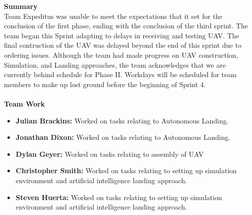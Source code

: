 \noindent \Large{\textbf{Summary}}\\
\normalsize Team Expeditus was unable to meet the expectations that it set for the conclusion of the first phase, ending with the conclusion of the third sprint. The team began this Sprint adapting to delays in receiving and testing UAV. The final contruction of the UAV was delayed beyond the end of this sprint due to ordering issues. Although the team had made progress on UAV construction, Simulation, and Landing approaches, the team acknowledges that we are currently behind schedule for Phase II. Workdays will be scheduled for team members to make up lost ground before the beginning of Sprint 4.\\
\vspace{5mm}
\\
\noindent \Large{\textbf{Team Work}}
\normalsize
\begin{itemize}
\item \textbf{Julian Brackins:} Worked on tasks relating to Autonomous Landing.
\item \textbf{Jonathan Dixon:} Worked on tasks relating to Autonomous Landing.
\item \textbf{Dylan Geyer:} Worked on tasks relating to assembly of UAV
\item \textbf{Christopher Smith:} Worked on tasks relating to setting up simulation environment and artificial intelligence landing approach.
\item \textbf{Steven Huerta:} Worked on tasks relating to setting up simulation environment and artificial intelligence landing approach.
\end{itemize}

